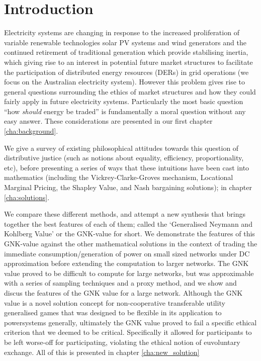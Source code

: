 \chapter{Introduction}
\label{cha:intro}


Electricity systems are changing in response to the increased proliferation of variable renewable technologies solar PV systems and wind generators and the continued retirement of traditional generation which provide stabilising inertia, which giving rise to an interest in potential future market structures to facilitate the participation of distributed energy resources (DERs) in grid operations (we focus on the Australian electricity system).
However this problem gives rise to general questions surrounding the ethics of market structures and how they could fairly apply in future electricity systems. Particularly the most basic question ``how \textit{should} energy be traded'' is fundamentally a moral question without any easy answer. These considerations are presented in our first chapter \ref{cha:background}.

We give a survey of existing philosophical attitudes towards this question of distributive justice (such as notions about equality, efficiency, proportionality, etc), before presenting a series of ways that these intuitions have been cast into mathematics (including the Vickrey-Clarke-Groves mechanism, Locational Marginal Pricing, the Shapley Value, and Nash bargaining solutions); in chapter \ref{cha:solutions}.

We compare these different methods, and attempt a new synthesis that brings together the best features of each of them; called the `Generalised Neymann and Kohlberg Value' or the GNK-value for short.
We demonstrate the features of this GNK-value against the other mathematical solutions in the context of trading the immediate consumption/generation of power on small sized networks under DC approximation before extending the computation to larger networks.
The GNK value proved to be difficult to compute for large networks, but was approximable with a series of sampling techniques and a proxy method, and we show and discus the features of the GNK value for a large network.
Although the GNK value is a novel solution concept for non-cooperative transferable utility generalised games that was designed to be flexible in its application to powersystems generally, ultimately the GNK value proved to fail a specific ethical criterion that we deemed to be critical.
Specifically it allowed for participants to be left worse-off for participating, violating the ethical notion of euvoluntary exchange.
All of this is presented in chapter \ref{cha:new_solution}

